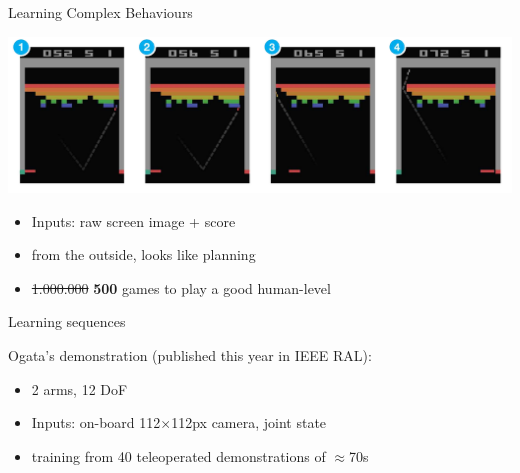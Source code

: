 \documentclass[compress]{beamer}
\begin{document}
{
\begin{frame}{Learning Complex Behaviours}

    \begin{center}
        \includegraphics[width=\linewidth]{breakout}
    \end{center}


        \begin{itemize}
            \item Inputs: raw screen image + score
            \item from the outside, looks like planning
            \item<2-> \sout{1.000.000} {\bf 500} games to play a good human-level
        \end{itemize}

\end{frame}
}


{
\begin{frame}{Learning sequences}

    Ogata's demonstration (published this year in IEEE RAL):

    \begin{itemize}
        \item 2 arms, 12 DoF
        \item Inputs: on-board 112$\times$112px camera, joint state
        \item<2-> training from 40 teleoperated demonstrations of $\approx$70s

    \end{itemize}

\end{frame}
}
\end{document}
